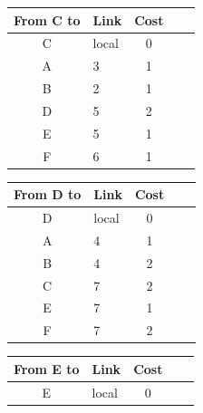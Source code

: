 \begin{enumerate}
\begin{enumerate}
\begin{table}[H]
\begin{tabular}{@{}clcll@{}}
                \toprule
                From C to            & \multicolumn{1}{c}{Link} & Cost                 \\ \midrule
                C                    & local                    & 0                    \\ 
                A                    & 3                        & 1                    \\
                B                    & 2                        & 1                    \\ 
                D                    & 5                        & 2                    \\ 
                E                    & 5                        & 1                    \\ 
                F                    & 6                        & 1                    \\ \bottomrule
            \end{tabular}
        \end{table}
        \begin{table}[H]
            \begin{tabular}{@{}clcll@{}}
                \toprule
                From D to            & \multicolumn{1}{c}{Link} & Cost                 \\ \midrule
                D                    & local                    & 0                    \\ 
                A                    & 4                        & 1                    \\ 
                B                    & 4                        & 2                    \\
                C                    & 7                        & 2                    \\
                E                    & 7                        & 1                    \\ 
                F                    & 7                        & 2                    \\ \bottomrule
            \end{tabular}
            \hfill
            \begin{tabular}{@{}clcll@{}}
                \toprule
                From E to            & \multicolumn{1}{c}{Link} & Cost                 \\ \midrule
                E                    & local                    & 0                    \\

\end{tabular}
\end{table}
\end{enumerate}
\end{enumerate}
